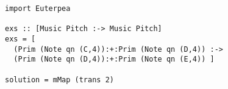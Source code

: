 \begin{lstlisting}
import Euterpea

exs :: [Music Pitch :-> Music Pitch]
exs = [
  (Prim (Note qn (C,4)):+:Prim (Note qn (D,4)) :->
  (Prim (Note qn (D,4)):+:Prim (Note qn (E,4)) ]
        
solution = mMap (trans 2)
\end{lstlisting}


